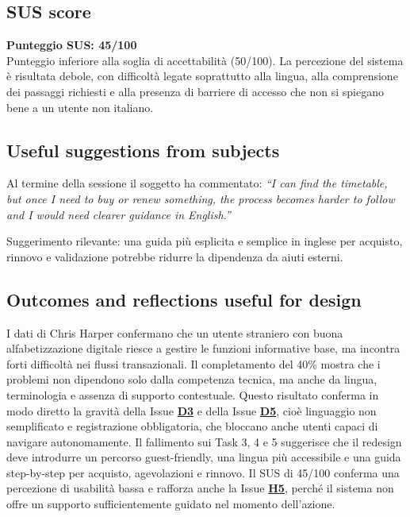 ﻿\documentclass[11pt,a4paper]{article}
\begin{document}
\subsection*{SUS score}
\begin{tcolorbox}[base]
\textbf{Punteggio SUS: 45/100}\\[0.2cm]
\small Punteggio inferiore alla soglia di accettabilità (50/100). La percezione del sistema è risultata debole, con difficoltà legate soprattutto alla lingua, alla comprensione dei passaggi richiesti e alla presenza di barriere di accesso che non si spiegano bene a un utente non italiano.
\end{tcolorbox}

\subsection*{Useful suggestions from subjects}
\begin{tcolorbox}[base]
Al termine della sessione il soggetto ha commentato: \textit{``I can find the timetable, but once I need to buy or renew something, the process becomes harder to follow and I would need clearer guidance in English.''}

Suggerimento rilevante: una guida più esplicita e semplice in inglese per acquisto, rinnovo e validazione potrebbe ridurre la dipendenza da aiuti esterni.
\end{tcolorbox}
\subsection*{Outcomes and reflections useful for design}
\begin{tcolorbox}[base]
I dati di Chris Harper confermano che un utente straniero con buona alfabetizzazione digitale riesce a gestire le funzioni informative base, ma incontra forti difficoltà nei flussi transazionali. Il completamento del 40\% mostra che i problemi non dipendono solo dalla competenza tecnica, ma anche da lingua, terminologia e assenza di supporto contestuale. Questo risultato conferma in modo diretto la gravità della Issue \textbf{\hyperref[iss:D3]{D3}} e della Issue \textbf{\hyperref[iss:D5]{D5}}, cioè linguaggio non semplificato e registrazione obbligatoria, che bloccano anche utenti capaci di navigare autonomamente. Il fallimento sui Task 3, 4 e 5 suggerisce che il redesign deve introdurre un percorso guest-friendly, una lingua più accessibile e una guida step-by-step per acquisto, agevolazioni e rinnovo. Il SUS di 45/100 conferma una percezione di usabilità bassa e rafforza anche la Issue \textbf{\hyperref[iss:H5]{H5}}, perché il sistema non offre un supporto sufficientemente guidato nel momento dell’azione.
\end{tcolorbox}
\end{document}
